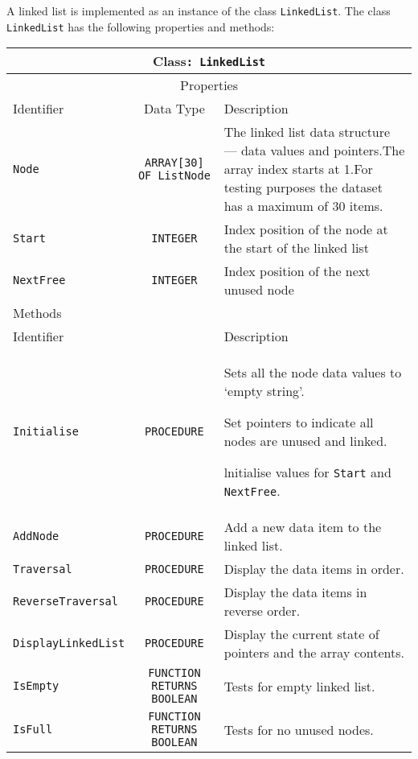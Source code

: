 A linked list is implemented as an instance of the class \texttt{LinkedList}.
The class \texttt{LinkedList} has the following properties and methods: 
\begin{center}
\begin{tabular}{|l|c|>{\raggedright}p{}|}
\hline 
\multicolumn{3}{|c|}{Class\texttt{: LinkedList}}\tabularnewline
\hline 
\multicolumn{3}{|c|}{Properties}\tabularnewline
\hline 
\texttt{\hspace{0.01\columnwidth}}Identifier & \texttt{\hspace{0.01\columnwidth}}Data Type & \texttt{\hspace{0.01\columnwidth}}Description\tabularnewline
\hline 
\texttt{Node} & \texttt{ARRAY{[}30{]} OF ListNode} & The linked list data structure --- data values and pointers.The array
index starts at 1.For testing purposes the dataset has a maximum of
30 items.\tabularnewline
\hline 
\texttt{Start} & \texttt{INTEGER} & Index position of the node at the start of the linked list\tabularnewline
\hline 
\texttt{NextFree} & \texttt{INTEGER} & Index position of the next unused node \tabularnewline
\hline 
\multicolumn{3}{|l|}{Methods}\tabularnewline
\hline 
\texttt{\hspace{0.01\columnwidth}}Identifier &  & \texttt{\hspace{0.01\columnwidth}}Description\tabularnewline
\hline 
\texttt{Initialise} & \texttt{PROCEDURE} & Sets all the node data values to \textquoteleft empty string\textquoteright .

Set pointers to indicate all nodes are unused and linked.

lnitialise values for \texttt{Start} and \texttt{NextFree}.\tabularnewline
\hline 
\texttt{AddNode} & \texttt{PROCEDURE} & Add a new data item to the linked list.\tabularnewline
\hline 
\texttt{Traversal} & \texttt{PROCEDURE} & Display the data items in order.\tabularnewline
\hline 
\texttt{ReverseTraversal} & \texttt{PROCEDURE} & Display the data items in reverse order.\tabularnewline
\hline 
\texttt{DisplayLinkedList} & \texttt{PROCEDURE} & Display the current state of pointers and the array contents.\tabularnewline
\hline 
\texttt{IsEmpty} & \texttt{FUNCTION RETURNS BOOLEAN} & Tests for empty linked list.\tabularnewline
\hline 
\texttt{IsFull} & \texttt{FUNCTION RETURNS BOOLEAN} & Tests for no unused nodes.\tabularnewline
\hline 
\end{tabular}
\par\end{center}

